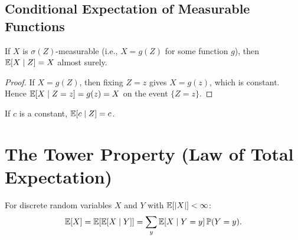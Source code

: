 \documentclass[11pt,a4paper]{article}
\begin{document}
\subsection{Conditional Expectation of Measurable Functions}
\label{subsec:measurable}

\begin{proposition}
\label{prop:cond_known}
If $X$ is $\sigma(Z)$-measurable (i.e., $X = g(Z)$ for some
function $g$), then
$\mathbb{E}[X \mid Z] = X$ almost surely.
\end{proposition}

\begin{proof}
If $X = g(Z)$, then fixing $Z = z$ gives $X = g(z)$, which is
constant.  Hence $\mathbb{E}[X \mid Z = z] = g(z) = X$ on the event
$\{Z = z\}$.
\end{proof}

\begin{corollary}
\label{cor:cond_constant}
If $c$ is a constant, $\mathbb{E}[c \mid Z] = c$.
\end{corollary}


\section{The Tower Property (Law of Total Expectation)}
\label{sec:tower}

\begin{keyresult}[title={Law of Total Expectation (Tower Property)}]
\begin{theorem}
\label{thm:tower}
For discrete random variables $X$ and $Y$ with
$\mathbb{E}[|X|] < \infty$:
\begin{equation}
  \mathbb{E}[X] = \mathbb{E}\!\left[\mathbb{E}[X \mid Y]\right]
  = \sum_y \mathbb{E}[X \mid Y = y]\, \mathbb{P}(Y = y).
  \label{eq:tower}
\end{equation}
\end{theorem}
\end{keyresult}
\end{document}
